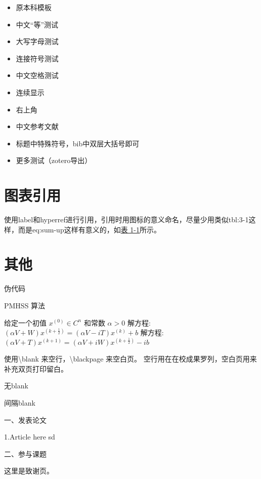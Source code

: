 \documentclass[AutoFakeBold]{LZUThesis-PgD&PhD}
\begin{document}
\begin{itemize}
    \item 原本科模板\cite{partl2016}
    \item 中文“等”测试\cite{partl2021}
    \item 大写字母测试\cite{partl2022-2}
    \item 连接符号测试\cite{partl2022-3}
    \item 中文空格测试\cite{partl2022}
    \item 连续显示\cite{partl2021,partl2022-2,partl2022-3}
    \item 右上角\cite{partl2016,partl2021,partl2022-2}
    \item 中文参考文献 \cite{李刚2006基于动态光谱的脉搏血氧测量精度分析}
    \item 标题中特殊符号，bib中双层大括号即可 \cite{PhysRevLett.108.024101}
    \item 更多测试（zotero导出）\cite{huangInvestigationThermalRectification2024, wanModulatingThermalConductivity2024, wuThermalRectificationAsymmetric2024, xiaoMOFNanozymemediatedAcetylcholinesterasefree2024}
\end{itemize}

\section{图表引用}


使用label和hyperref进行引用，引用时用图标的意义命名，尽量少用类似tbl:3-1这样，而是eq:sum-up这样有意义的，如\hyperref[tbl:mole]{表 1-1}所示。

\section{其他}


伪代码

\begin{algorithm}[H]
    \caption{PMHSS 算法\label{Alg:PMHSS}}
    \begin{algorithmic}[1]
        \State 给定一个初值 $ x^{(0)} \in C^{n} $  和常数 $\alpha>0$
        \State 解方程: $(\alpha V+W)x^{(k+\frac{1}{2})}=(\alpha V-i T)x^{(k)}+b $
        \State 解方程: $(\alpha V+T)x^{(k+1)}=(\alpha V+i W)x^{(k+\frac{1}{2})}-i b$
        \EndFor
    \end{algorithmic}
\end{algorithm}

使用\textbackslash blank 来空行，\textbackslash blackpage 来空白页。
空行用在在校成果罗列，空白页用来补充双页打印留白。

无blank

\blank

间隔blank
\blankpage




\backmatter


\printbib



\Achievements
一、发表论文

1.Article here sd

\blank

二、参与课题




\Thanks

这里是致谢页。
\end{document}
